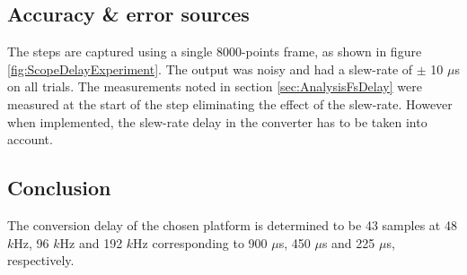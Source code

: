 \subsection{Accuracy \& error sources}

The steps are captured using a single 8000-points frame, as shown in figure \ref{fig:ScopeDelayExperiment}. The output was noisy and had a slew-rate of $\pm$ 10 $\mu $s on all trials. The measurements noted in section \ref{sec:AnalysisFsDelay} were measured at the start of the step eliminating the effect of the slew-rate. However when implemented, the slew-rate delay in the converter has to be taken into account.


\subsection{Conclusion}
The conversion delay of the chosen platform is determined to be 43 samples at 48 $k$Hz, 96 $k$Hz and 192 $k$Hz corresponding to 900 $\mu$s, 450 $\mu$s and 225 $\mu$s, respectively.

